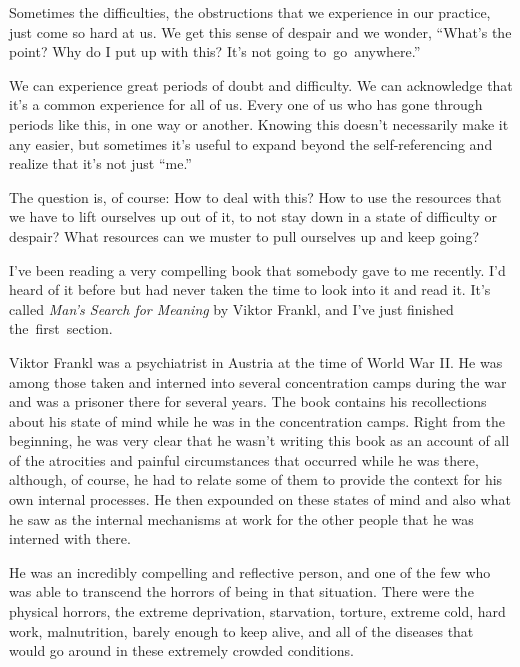 Sometimes the difficulties, the obstructions that we experience in our practice, just come so hard at us. We get this sense of despair and we wonder, ``What's the point? Why do I put up with this? It's not going \mbox{to go anywhere}.''

We can experience great periods of doubt and difficulty. We can acknowledge that it's a common experience for all of us. Every one of us who has gone through periods like this, in one way or another. Knowing this doesn't necessarily make it any easier, but sometimes it's useful to expand beyond the self-referencing and realize that it's not just ``me.''

The question is, of course: How to deal with this? How to use the resources that we have to lift ourselves up out of it, to not stay down in a state of difficulty or despair? What resources can we muster to pull ourselves up and keep going?

I've been reading a very compelling book that somebody gave to me recently. I'd heard of it before but had never taken the time to look into it and read it. It's called \emph{Man's Search for Meaning} by Viktor Frankl, and I've just finished \mbox{the first section.}

Viktor Frankl was a psychiatrist in Austria at the time of World War II. He was among those taken and interned into several concentration camps during the war and was a prisoner there for several years. The book contains his recollections about his state of mind while he was in the concentration camps. Right from the beginning, he was very clear that he wasn't writing this book as an account of all of the atrocities and painful circumstances that occurred while he was there, although, of course, he had to relate some of them to provide the context for his own internal processes. He then expounded on these states of mind and also what he saw as the internal mechanisms at work for the other people that he was interned with there.

He was an incredibly compelling and reflective person, and one of the few who was able to transcend the horrors of being in that situation. There were the physical horrors, the extreme deprivation, starvation, torture, extreme cold, hard work, malnutrition, barely enough to keep alive, and all of the diseases that would go around in these extremely crowded conditions.

